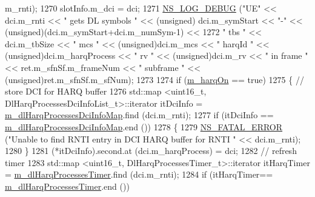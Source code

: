 \begin{DoxyCode}
      m\_rnti);
1270                         slotInfo.m\_dci = dci;
1271                         \hyperlink{group__logging_ga413f1886406d49f59a6a0a89b77b4d0a}{NS\_LOG\_DEBUG} (\textcolor{stringliteral}{"UE"} << dci.m\_rnti << \textcolor{stringliteral}{" gets DL symbols "} << (\textcolor{keywordtype}{unsigned})
      dci.m\_symStart << \textcolor{stringliteral}{"-"} << (\textcolor{keywordtype}{unsigned})(dci.m\_symStart+dci.m\_numSym-1) <<
1272                                                                                 \textcolor{stringliteral}{" tbs "} << dci.m\_tbSize << \textcolor{stringliteral}{
      " mcs "} << (\textcolor{keywordtype}{unsigned})dci.m\_mcs << \textcolor{stringliteral}{" harqId "} << (\textcolor{keywordtype}{unsigned})dci.m\_harqProcess << \textcolor{stringliteral}{" rv "} << (\textcolor{keywordtype}{unsigned})dci.m\_rv 
      << \textcolor{stringliteral}{" in frame "} << ret.m\_sfnSf.m\_frameNum << \textcolor{stringliteral}{" subframe "} << (\textcolor{keywordtype}{unsigned})ret.m\_sfnSf.m\_sfNum);
1273 
1274                         \textcolor{keywordflow}{if} (\hyperlink{classns3_1_1MmWaveFlexTtiPfMacScheduler_ab7edfa7baaf0e2ce6c2ba43efc59e291}{m\_harqOn} == \textcolor{keyword}{true})
1275                         \{       \textcolor{comment}{// store DCI for HARQ buffer}
1276                                 std::map <uint16\_t, DlHarqProcessesDciInfoList\_t>::iterator itDciInfo = 
      \hyperlink{classns3_1_1MmWaveFlexTtiPfMacScheduler_a409de362c5e49fc6956b26ee2644db4d}{m\_dlHarqProcessesDciInfoMap}.find (dci.m\_rnti);
1277                                 \textcolor{keywordflow}{if} (itDciInfo == \hyperlink{classns3_1_1MmWaveFlexTtiPfMacScheduler_a409de362c5e49fc6956b26ee2644db4d}{m\_dlHarqProcessesDciInfoMap}.end
       ())
1278                                 \{
1279                                         \hyperlink{group__fatal_ga5131d5e3f75d7d4cbfd706ac456fdc85}{NS\_FATAL\_ERROR} (\textcolor{stringliteral}{"Unable to find RNTI entry in DCI
       HARQ buffer for RNTI "} << dci.m\_rnti);
1280                                 \}
1281                                 (*itDciInfo).second.at (dci.m\_harqProcess) = dci;
1282                                 \textcolor{comment}{// refresh timer}
1283                                 std::map <uint16\_t, DlHarqProcessesTimer\_t>::iterator itHarqTimer =  
      \hyperlink{classns3_1_1MmWaveFlexTtiPfMacScheduler_a833b2d085a67e2fcb7403ebe1f4c6f86}{m\_dlHarqProcessesTimer}.find (dci.m\_rnti);
1284                                 \textcolor{keywordflow}{if} (itHarqTimer== \hyperlink{classns3_1_1MmWaveFlexTtiPfMacScheduler_a833b2d085a67e2fcb7403ebe1f4c6f86}{m\_dlHarqProcessesTimer}.end ())

\end{DoxyCode}
